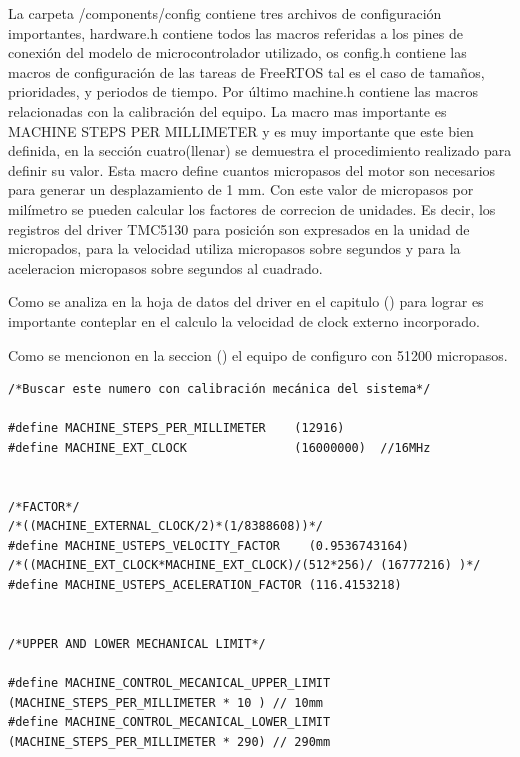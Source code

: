 La carpeta /components/config contiene tres archivos de configuración importantes, hardware.h contiene todos las macros referidas a los pines de conexión del modelo de microcontrolador utilizado, os config.h contiene las macros de configuración de las tareas de FreeRTOS tal es el caso de tamaños, prioridades, y periodos de tiempo.
Por último machine.h contiene las macros relacionadas con la calibración del equipo. La macro mas importante es MACHINE STEPS PER MILLIMETER y es muy importante que este bien definida, en la sección cuatro(llenar) se demuestra el procedimiento realizado para definir su valor. Esta macro define cuantos micropasos del motor son necesarios para generar un desplazamiento de 1 mm. Con este valor de micropasos por milímetro se pueden calcular los factores de correcion de unidades. Es decir, los registros del driver TMC5130 para posición son expresados en la unidad de micropados, para la velocidad utiliza micropasos sobre segundos y para la aceleracion micropasos sobre segundos al cuadrado.

Como se analiza en la hoja de datos del driver \citep{3_web_trinamic_producto}  en el capitulo () para lograr es importante conteplar en el calculo la velocidad de clock externo incorporado.

Como se mencionon en la seccion () el equipo de configuro con 51200 micropasos.  
 
 

\begin{lstlisting}[label=cod:vControl,caption=Pseudocódigo del lazo principal de control.]  % Start your code-block
/*Buscar este numero con calibración mecánica del sistema*/

#define MACHINE_STEPS_PER_MILLIMETER	(12916)		
#define MACHINE_EXT_CLOCK				(16000000)	//16MHz


/*FACTOR*/
/*((MACHINE_EXTERNAL_CLOCK/2)*(1/8388608))*/	
#define MACHINE_USTEPS_VELOCITY_FACTOR	  (0.9536743164)
/*((MACHINE_EXT_CLOCK*MACHINE_EXT_CLOCK)/(512*256)/ (16777216) )*/
#define MACHINE_USTEPS_ACELERATION_FACTOR (116.4153218)


/*UPPER AND LOWER MECHANICAL LIMIT*/

#define MACHINE_CONTROL_MECANICAL_UPPER_LIMIT 	(MACHINE_STEPS_PER_MILLIMETER * 10 ) // 10mm
#define MACHINE_CONTROL_MECANICAL_LOWER_LIMIT	(MACHINE_STEPS_PER_MILLIMETER * 290) // 290mm

\end{lstlisting}


\label{sec:Módulos principales}




